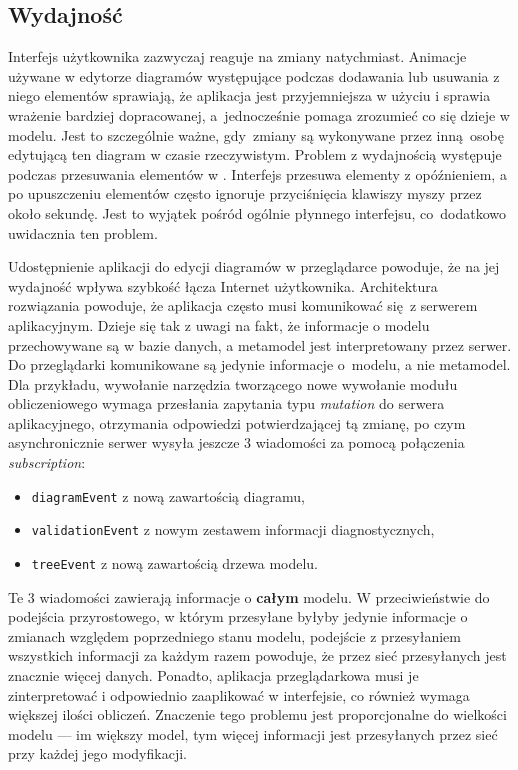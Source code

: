 \subsection{Wydajność}

Interfejs użytkownika \SiriusWeb{} zazwyczaj reaguje na zmiany natychmiast.
Animacje używane w edytorze diagramów występujące podczas dodawania lub
usuwania z niego elementów sprawiają, że aplikacja jest przyjemniejsza w użyciu
i sprawia wrażenie bardziej dopracowanej, a~jednocześnie pomaga zrozumieć co
się dzieje w modelu. Jest to szczególnie ważne, gdy~zmiany są wykonywane przez
inną osobę edytującą ten diagram w czasie rzeczywistym.
Problem z wydajnością występuje podczas przesuwania elementów w \SiriusWeb{}.
Interfejs przesuwa elementy z opóźnieniem, a po upuszczeniu
elementów
często ignoruje przyciśnięcia klawiszy myszy przez około sekundę. Jest to
wyjątek pośród ogólnie płynnego interfejsu, co~dodatkowo uwidacznia ten
problem.

Udostępnienie aplikacji do edycji diagramów w przeglądarce powoduje, że na
jej wydajność wpływa szybkość łącza Internet użytkownika. Architektura
rozwiązania \SiriusWeb{} powoduje, że aplikacja często musi komunikować
się z serwerem aplikacyjnym. Dzieje się tak z uwagi na fakt, że informacje o
modelu przechowywane są w bazie danych, a metamodel \EMF{} jest
interpretowany przez serwer. Do przeglądarki komunikowane są jedynie informacje
o~modelu, a nie metamodel. Dla przykładu, wywołanie narzędzia tworzącego nowe
wywołanie modułu obliczeniowego wymaga przesłania zapytania typu
\emph{mutation} do serwera aplikacyjnego, otrzymania odpowiedzi potwierdzającej
tą zmianę, po czym asynchronicznie serwer wysyła jeszcze 3 wiadomości
za pomocą połączenia \GraphQL{} \emph{subscription}:

\begin{itemize}
	\item \texttt{diagramEvent} z nową zawartością diagramu,
	\item \texttt{validationEvent} z nowym zestawem informacji
	      diagnostycznych,
	\item \texttt{treeEvent} z nową zawartością drzewa modelu.
\end{itemize}

Te 3 wiadomości zawierają informacje o \textbf{całym} modelu. W przeciwieństwie
do podejścia przyrostowego, w którym przesyłane byłyby jedynie informacje o
zmianach względem poprzedniego stanu modelu, podejście z przesyłaniem
wszystkich informacji za każdym razem powoduje, że przez sieć przesyłanych jest
znacznie więcej danych. Ponadto, aplikacja przeglądarkowa musi je
zinterpretować i odpowiednio zaaplikować w interfejsie, co również wymaga
większej ilości obliczeń. Znaczenie tego problemu jest proporcjonalne do
wielkości modelu --- im większy model, tym więcej informacji jest przesyłanych
przez sieć przy każdej jego modyfikacji.

